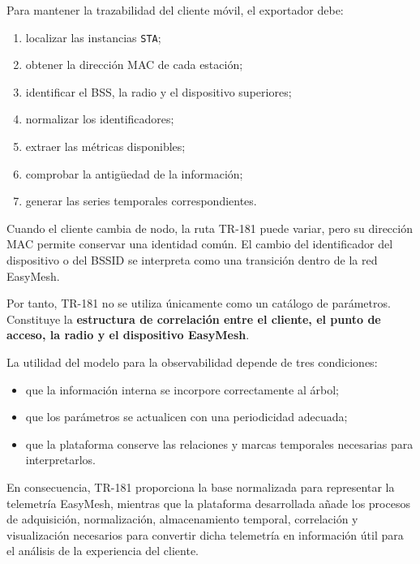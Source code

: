 Para mantener la trazabilidad del cliente móvil, el exportador debe:

\begin{enumerate}
    \item localizar las instancias \texttt{STA};

    \item obtener la dirección MAC de cada estación;

    \item identificar el BSS, la radio y el dispositivo superiores;

    \item normalizar los identificadores;

    \item extraer las métricas disponibles;

    \item comprobar la antigüedad de la información;

    \item generar las series temporales correspondientes.
\end{enumerate}

Cuando el cliente cambia de nodo, la ruta TR-181 puede variar, pero su
dirección MAC permite conservar una identidad común. El cambio del
identificador del dispositivo o del BSSID se interpreta como una
transición dentro de la red EasyMesh.

Por tanto, TR-181 no se utiliza únicamente como un catálogo de
parámetros. Constituye la
\textbf{estructura de correlación entre el cliente, el punto de acceso,
la radio y el dispositivo EasyMesh}.

La utilidad del modelo para la observabilidad depende de tres
condiciones:

\begin{itemize}
    \item que la información interna se incorpore correctamente al árbol;
    \item que los parámetros se actualicen con una periodicidad adecuada;
    \item que la plataforma conserve las relaciones y marcas temporales
    necesarias para interpretarlos.
\end{itemize}

En consecuencia, TR-181 proporciona la base normalizada para representar
la telemetría EasyMesh, mientras que la plataforma desarrollada añade los
procesos de adquisición, normalización, almacenamiento temporal,
correlación y visualización necesarios para convertir dicha telemetría en
información útil para el análisis de la experiencia del cliente.

